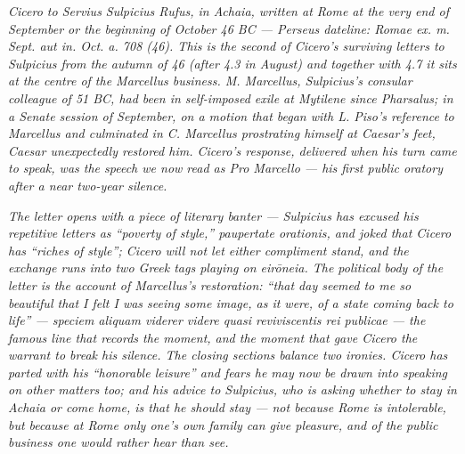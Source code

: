 
\textit{Cicero to Servius Sulpicius Rufus, in Achaia, written at
Rome at the very end of September or the beginning of October 46
BC --- Perseus dateline: \textit{Romae ex. m. Sept. aut in. Oct.
a. 708 (46)}. This is the second of Cicero's surviving letters
to Sulpicius from the autumn of 46 (after 4.3 in August) and
together with 4.7 it sits at the centre of the Marcellus
business. M. Marcellus, Sulpicius's consular colleague of 51 BC,
had been in self-imposed exile at Mytilene since Pharsalus; in a
Senate session of September, on a motion that began with L.
Piso's reference to Marcellus and culminated in C. Marcellus
prostrating himself at Caesar's feet, Caesar unexpectedly
restored him. Cicero's response, delivered when his turn came to
speak, was the speech we now read as \textit{Pro Marcello} ---
his first public oratory after a near two-year silence.}

\textit{The letter opens with a piece of literary banter ---
Sulpicius has excused his repetitive letters as ``poverty of
style,'' \textit{paupertate orationis}, and joked that Cicero
has ``riches of style''; Cicero will not let either compliment
stand, and the exchange runs into two Greek tags playing on
\textit{eir\=oneia}. The political body of the letter is the
account of Marcellus's restoration: ``that day seemed to me so
beautiful that I felt I was seeing some image, as it were, of a
state coming back to life'' --- \textit{speciem aliquam viderer
videre quasi reviviscentis rei publicae} --- the famous line
that records the moment, and the moment that gave Cicero the
warrant to break his silence. The closing sections balance two
ironies. Cicero has parted with his ``honorable leisure'' and
fears he may now be drawn into speaking on other matters too;
and his advice to Sulpicius, who is asking whether to stay in
Achaia or come home, is that he should stay --- not because Rome
is intolerable, but because at Rome only one's own family can
give pleasure, and of the public business one would rather hear
than see.}
